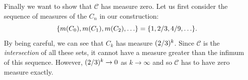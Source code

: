 \documentclass{article}
\newcommand{\CA}{\mathcal{C}}
\begin{document}
Finally we want to show that $\CA$ has measure zero.
Let us first consider the sequence of measures of the $C_{n}$ in our construction:
\[
  \lbrace m(C_{0}), m(C_{1}), m(C_{2}), \ldots \rbrace
  =
  \lbrace 1, 2/3, 4/9, \ldots \rbrace.
\]
By being careful, we can see that $C_{k}$ has measure $\lparen2/3\rparen^{k}$.
Since $\CA$ is the \emph{intersection} of all these sets, it cannot have a measure
greater than the infimum of this sequence. However, $\lparen2/3\rparen^{k} \to 0$ as $k \to \infty$
and so $\CA$ has to have zero measure exactly.
\end{document}
